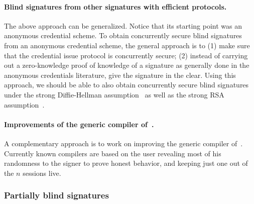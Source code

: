 \paragraph{Blind signatures from other signatures with efficient protocols.}  The above approach can be generalized.  Notice that its starting point was an anonymous credential scheme. To obtain concurrently secure blind signatures from an anonymous credential scheme, the general approach is to (1) make sure that the credential issue protocol is concurrently secure; (2) instead of carrying out a zero-knowledge proof of knowledge of a signature as generally done in the anonymous credentials literature, give the signature in the clear.  Using this approach, we should be able to also obtain concurrently secure blind signatures under the strong Diffie-Hellman assumption~\cite{EPRINT:CamDriLeh16} as well as the strong RSA assumption~\cite{lysyan02a,SCN:CamLys02}.  


\paragraph{Improvements of the generic compiler of~\cite{chllw22}.}  A complementary approach is to work on improving the generic compiler of~\cite{chllw22}.  
Currently known compilers are based on the user revealing most of his randomness to the signer to prove honest behavior, and keeping just one out of the $n$ sessions live.  


\subsubsection{Partially blind signatures}
\label{rg1:partially}



